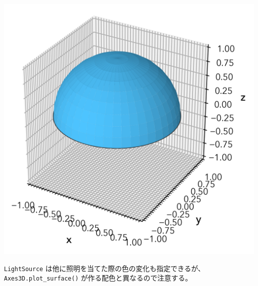 \documentclass[a4paper, 10pt, notitlepage, twocolumn, uplatex, oneside, dvipdfmx]{jsarticle}
\begin{document}
\label{}
\begin{center}
\includegraphics[width=1.0\linewidth]{./obipy-resources/light_3d.png}
\end{center}

\texttt{LightSource} は他に照明を当てた際の色の変化も指定できるが、
\texttt{Axes3D.plot\_surface()} が作る配色と異なるので注意する。
\end{document}
